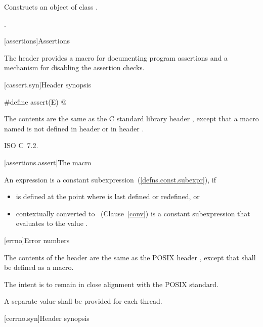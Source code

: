 \begin{itemdescr}
\pnum
\effects
Constructs an object of class
.

\pnum
\postcondition
{}.
\end{itemdescr}

[assertions]{Assertions}

\pnum
The header
provides a macro for documenting \Cpp program assertions and a mechanism
for disabling the assertion checks.

[cassert.syn]{Header  synopsis}

%
%
\begin{codeblock}
#define assert(E) @\seebelow@
\end{codeblock}

\pnum
{}%
%
The contents are the same as the C standard library header
,
except that a macro named 
is not defined in header 
or in header .

\xref ISO C~7.2.

[assertions.assert]{The  macro}

\pnum
An expression 
is a constant subexpression~(\ref{defns.const.subexpr}), if
\begin{itemize}
\item
{} is defined at the point where 
is last defined or redefined, or
\item
{} contextually converted to ~(Clause~\ref{conv})
is a constant subexpression that evaluates to the value .
\end{itemize}

[errno]{Error numbers}

\pnum
{}%
The contents of the header  are the same as the POSIX header
, except that  shall be defined as a macro.
\begin{note}
The intent is to remain in close alignment with the POSIX standard.
\end{note}
A separate  value shall be provided for each thread.

[cerrno.syn]{Header  synopsis}

